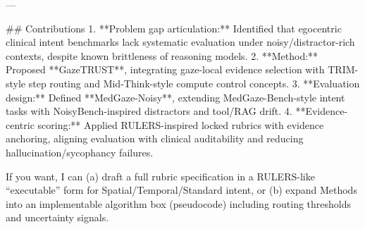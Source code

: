 ---

## Contributions  
1. **Problem gap articulation:** Identified that egocentric clinical intent benchmarks lack systematic evaluation under noisy/distractor-rich contexts, despite known brittleness of reasoning models.  
2. **Method:** Proposed **GazeTRUST**, integrating gaze-local evidence selection with TRIM-style step routing and Mid-Think-style compute control concepts.  
3. **Evaluation design:** Defined **MedGaze-Noisy**, extending MedGaze-Bench-style intent tasks with NoisyBench-inspired distractors and tool/RAG drift.  
4. **Evidence-centric scoring:** Applied RULERS-inspired locked rubrics with evidence anchoring, aligning evaluation with clinical auditability and reducing hallucination/sycophancy failures.

If you want, I can (a) draft a full rubric specification in a RULERS-like “executable” form for Spatial/Temporal/Standard intent, or (b) expand Methods into an implementable algorithm box (pseudocode) including routing thresholds and uncertainty signals.